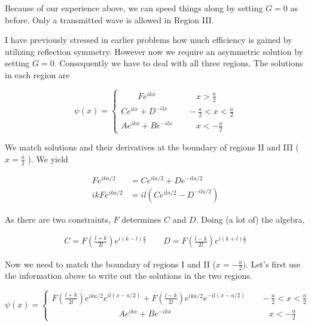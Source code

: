 Because of our experience above, we can speed things along by setting $G = 0$
as before. Only a transmitted wave is allowed in Region III. 

I have previously stressed in earlier problems how much efficiency is gained by
utilizing reflection symmetry. However now we require an asymmetric solution by
setting $G = 0$. Consequently we have to deal with all three regions. The
solutions in each region are

\[
\psi(x) = \begin{cases}
  \qquad F e^{ikx} &\quad \quad x > \frac{a}{2} \\ Ce^{ilx} + D^{-ilx} &\quad -\frac{a}{2}
  < x< \frac{a}{2} \\ Ae^{ikx} + Be^{-ilx} &\quad \quad x < -\frac{a}{2}
\end{cases} 
\] \vspace{3px}

We match solutions and their derivatives at the boundary of regions II and III
($x = \frac{a}{2}$ ). We yield 

\begin{align*}
  Fe^{ika/2} &= Ce^{ila/2} + De^{-ila/2} \\ ikFe^{ika/2} &= il\left( Ce^{ila/2}
  - D^{-ila/2}\right)  
\end{align*}

As there are two constraints, $F$ determines $C$ and $D$. Doing (a lot of) the
algebra, 

\begin{align} \label{}
  C = F\left( \frac{l + k}{2l} \right) e^{i(k - l) \frac{a}{2}} \qquad
  D = F\left( \frac{l-k}{2l} \right) e^{i(k+l) \frac{a}{2}}  
\end{align}\vspace{3px}


Now we need to match the boundary of regions I and II ($x = -\frac{a}{2})$.
Let's first use the information above to write out the solutions in the two
regions. 

\[
\psi(x) = \begin{cases}
  F \left( \frac{l+k}{2l}\right) e^{ika / 2} e^{il(x - a/2)} + F \left(
  \frac{l-k}{2l}\right) e^{ika/2} e^{-il(x - a/2)} &\quad -\frac{a}{2}
  < x < \frac{a}{2} \\ \qquad \qquad \qquad \qquad Ae^{ikx} + Be^{-ikx}
                                                   &\quad \quad x < -\frac{a}{2}  
\end{cases} 
\] \vspace{3px}

